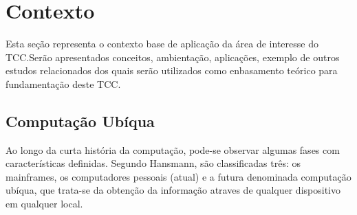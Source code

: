 \section{Contexto}

Esta seção representa o contexto base de aplicação da área de
interesse do TCC.Serão apresentados conceitos, ambientação, aplicações,
exemplo de outros estudos relacionados dos quais serão utilizados como
enbasamento teórico para fundamentação deste TCC.

\subsection{Computação Ubíqua}

Ao longo da curta história da computação, pode-se observar algumas
fases com características definidas. Segundo Hansmann, são
classificadas três: os mainframes, os computadores pessoais (atual)
e a futura denominada computação ubíqua, que trata-se da obtenção da
informação atraves de qualquer dispositivo em qualquer local.
